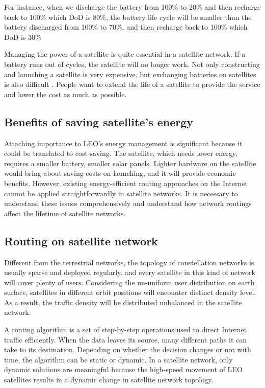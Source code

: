 For instance, when we discharge the battery from 100\% to 20\% and then recharge back to 100\% which DoD is 80\%, the battery life cycle will be smaller than the battery discharged from 100\% to 70\%, and then recharge back to 100\% which DoD is 30\% \cite{TOWARDS}

Managing the power of a satellite is quite essential in a satellite network. If a battery runs out of cycles, the satellite will no longer work. Not only constructing and launching a satellite is very expensive, but exchanging batteries on satellites is also difficult \cite{LAUNCH}. People want to extend the life of a satellite to provide the service and lower the cost as much as possible.

\subsection{Benefits of saving satellite's energy}
Attaching importance to LEO's energy management is significant because it could be translated to cost-saving. The satellite, which needs lower energy, requires a smaller battery, smaller solar panels. Lighter hardware on the satellite would bring about saving costs on launching, and it will provide economic benefits. However, existing energy-efficient routing approaches on the Internet cannot be applied straightforwardly in satellite networks. It is necessary to understand these issues comprehensively and understand how network routings affect the lifetime of satellite networks. 

\subsection{Routing on satellite network}
Different from the terrestrial networks, the topology of constellation networks is usually sparse and deployed regularly.  and every satellite in this kind of network will cover plenty of users. Considering the un-uniform user distribution on earth surface, satellites in different orbit positions will encounter distinct density level. As a result, the traffic density will be distributed unbalanced in the satellite network.

A routing algorithm is a set of step-by-step operations used to direct Internet traffic efficiently. When the data leaves its source, many different paths it can take to its destination. Depending on whether the decision changes or not with time, the algorithm can be static or dynamic. In a satellite network, only dynamic solutions are meaningful because the high-speed movement of LEO satellites results in a dynamic change in satellite network topology.

